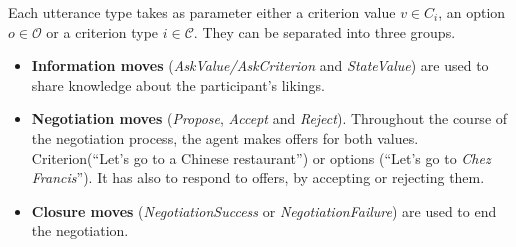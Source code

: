 \documentclass[runningheads,a4paper]{llncs}
\begin{document}
	
	Each utterance type takes as parameter either a criterion value $v \in C_i$, an option $o \in \mathcal{O}$ or a criterion type $i \in \mathcal{C}$. They can be separated into three groups. 
	
	\begin{itemize}
		\item \textbf{Information moves }(\textit{AskValue/AskCriterion} and \textit{StateValue}) are used to share knowledge about the participant's likings.
		\item \textbf{Negotiation moves} (\textit{Propose}, \textit{Accept} and \textit{Reject}). Throughout the course of the negotiation process, the agent makes offers for both values. Criterion(``Let's go to a Chinese restaurant'') or options (``Let's go to \emph{Chez Francis}''). It has also to respond to offers, by accepting or rejecting them.
		
		\item \textbf{Closure moves} (\textit{NegotiationSuccess} or \textit{NegotiationFailure}) are used to end the negotiation.
	\end{itemize}
	
	
	
\end{document}

